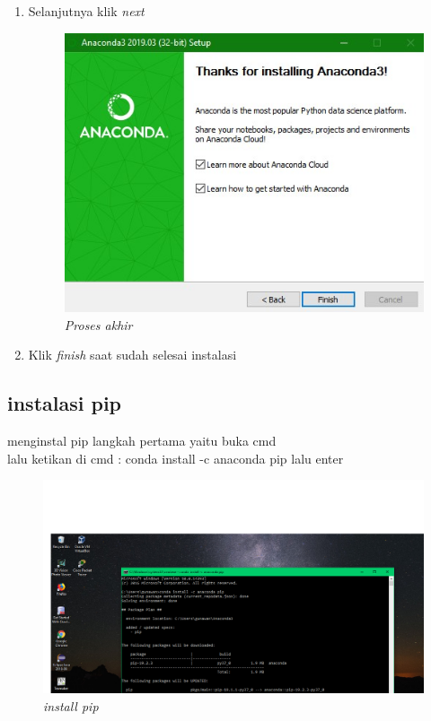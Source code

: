 \begin{enumerate}
\item Selanjutnya klik \textit{next} 


\begin{figure}[!htbp]
    \centering
    \includegraphics[scale=0.6]{gambar/9.jpg}
    \caption{\textit{Proses akhir}}
    \label{Figure9}
\end{figure}

\item Klik \textit{finish} saat sudah selesai instalasi

 
\end{enumerate}
\subsection{instalasi pip}
\Cara menginstal pip langkah pertama yaitu buka cmd\\
lalu ketikan di cmd : conda install -c anaconda pip lalu enter\\

\begin{figure}[!htbp]
    \centering
    \includegraphics[scale=0.3]{gambar/Instal pip.png}
    \caption{\textit{install pip}}
    \label{Figur88e1}
\end{figure}

